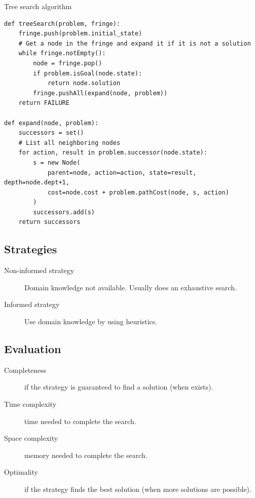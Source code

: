 \begin{algorithm}
\caption{Tree search algorithm} \label{alg:search_tree_search}
\begin{lstlisting}
def treeSearch(problem, fringe):
    fringe.push(problem.initial_state)
    # Get a node in the fringe and expand it if it is not a solution
    while fringe.notEmpty():
        node = fringe.pop()
        if problem.isGoal(node.state):
            return node.solution
        fringe.pushAll(expand(node, problem))
    return FAILURE

def expand(node, problem):
    successors = set()
    # List all neighboring nodes
    for action, result in problem.successor(node.state):
        s = new Node(
            parent=node, action=action, state=result, depth=node.dept+1,
            cost=node.cost + problem.pathCost(node, s, action)
        )
        successors.add(s)
    return successors
\end{lstlisting}
\end{algorithm}


\subsection{Strategies}
\begin{description}
    \item[Non-informed strategy] 
        Domain knowledge not available. Usually does an exhaustive search.

    \item[Informed strategy] 
        Use domain knowledge by using heuristics.
\end{description}


\subsection{Evaluation}
\begin{description}
    \item[Completeness] 
        if the strategy is guaranteed to find a solution (when exists).

    \item[Time complexity] 
        time needed to complete the search.

    \item[Space complexity] 
        memory needed to complete the search.

    \item[Optimality] 
        if the strategy finds the best solution (when more solutions are possible).
\end{description}



